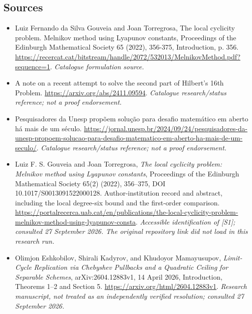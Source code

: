 \documentclass[11pt,a4paper]{article}
\numberwithin{equation}{section}
\begin{document}
\subsection{Sources}
\begin{itemize}\raggedright
\item[\textnormal{[S1]}]\hypertarget{source:statement:1}{} Luiz Fernando da Silva Gouveia and Joan Torregrosa, The local cyclicity problem. Melnikov method using Lyapunov constants, Proceedings of the Edinburgh Mathematical Society 65 (2022), 356-375, Introduction, p. 356.
\url{https://recercat.cat/bitstream/handle/2072/532013/MelnikovMethod.pdf?sequence=1}.
{\small\textit{Catalogue formulation source.}}
\item[\textnormal{[S2]}]\hypertarget{source:statement:2}{} A note on a recent attempt to solve the second part of Hilbert's 16th Problem.
\url{https://arxiv.org/abs/2411.09594}.
{\small\textit{Catalogue research/status reference; not a proof endorsement.}}
\item[\textnormal{[S3]}]\hypertarget{source:statement:3}{} Pesquisadores da Unesp propõem solução para desafio matemático em aberto há mais de um século.
\url{https://jornal.unesp.br/2024/09/24/pesquisadores-da-unesp-propoem-solucao-para-desafio-matematico-em-aberto-ha-mais-de-um-seculo/}.
{\small\textit{Catalogue research/status reference; not a proof endorsement.}}
\item[\textnormal{[E1]}]\hypertarget{extra:statement:1}{} Luiz F. S. Gouveia and Joan Torregrosa,
\emph{The local cyclicity problem: Melnikov method using Lyapunov constants},
Proceedings of the Edinburgh Mathematical Society 65(2) (2022), 356--375,
DOI 10.1017/S0013091522000128. Author-institution record and abstract,
including the local degree-six bound and the first-order comparison.
\url{https://portalrecerca.uab.cat/en/publications/the-local-cyclicity-problem-melnikov-method-using-lyapunov-consta}.
{\small\textit{Accessible identification of [S1]; consulted 27 September 2026.
The original repository link did not load in this research run.}}
\item[\textnormal{[E2]}]\hypertarget{extra:statement:2}{} Olimjon Eshkobilov, Shirali Kadyrov,
and Khudoyor Mamayusupov, \emph{Limit-Cycle Replication via Chebyshev Pullbacks
and a Quadratic Ceiling for Separable Schemes}, arXiv:2604.12883v1,
14 April 2026, Introduction, Theorems 1--2 and Section 5.
\url{https://arxiv.org/html/2604.12883v1}.
{\small\textit{Research manuscript, not treated as an independently verified
resolution; consulted 27 September 2026.}}
\end{itemize}
\end{document}
